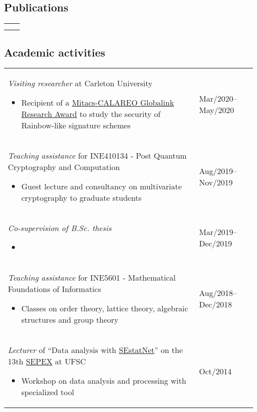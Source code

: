 \documentclass[12pt]{article}
\makeatletter
\newenvironment{datetable}
  {\newcolumntype{R}{>{\raggedleft\arraybackslash}p{0.14\textwidth}}
   \newcolumntype{L}{p{0.82\textwidth}}
   \begin{tabular}{@{\hspace{0mm}}LR}}
  {\end{tabular}}
\newenvironment{contenttable}[1]
  {\subsection*{#1}
   \begin{datetable}}
  {\end{datetable}}
\makeatother
\begin{document}
\begin{contenttable}{Publications}
  \hspace{0mm}
    & \cite{Zambonin:inproc:2019:jul} \vspace{1.25cm} \\

  \hspace{0mm}
    & \cite{Perin:inproc:2018:jun} \\
\end{contenttable}

\begin{contenttable}{Academic activities}
  \textit{Visiting researcher} at Carleton University
  \begin{itemize}
    \item Recipient of a \href{http://archive.is/RHxm4}{Mitacs-CALAREO
        Globalink Research Award} to study the security of Rainbow-like
          signature schemes
  \end{itemize} & Mar/2020--May/2020 \\

  \textit{Teaching assistance} for INE410134 - Post Quantum Cryptography and
    Computation
  \begin{itemize}
    \item Guest lecture and consultancy on multivariate cryptography to
        graduate students
  \end{itemize} & Aug/2019--Nov/2019 \\

  \textit{Co-supervision of B.Sc. thesis}
  \begin{itemize}
    \item {}
  \end{itemize} & Mar/2019--Dec/2019 \\

  \textit{Teaching assistance} for INE5601 - Mathematical Foundations of
    Informatics
  \begin{itemize}
    \item Classes on order theory, lattice theory, algebraic structures and
        group theory
  \end{itemize} & Aug/2018--Dec/2018 \\

  \textit{Lecturer} of ``Data analysis with
    \href{http://sestatnet.ufsc.br}{SEstatNet}'' on the 13th
    \href{https://sepex.ufsc.br/}{SEPEX} at UFSC
  \begin{itemize}
    \item Workshop on data analysis and processing with specialized tool
  \end{itemize} & Oct/2014 \\


\end{contenttable}
\end{document}
